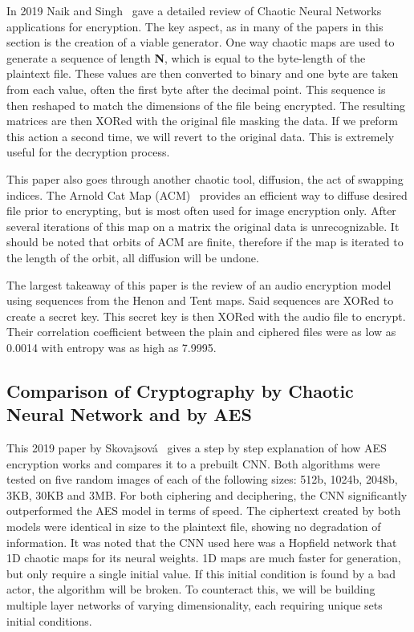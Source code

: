 \documentclass[conference]{IEEEtran}
\begin{document}
In 2019 Naik and Singh~\cite{Naik2022} gave a detailed review of Chaotic Neural Networks applications for encryption.
The key aspect, as in many of the papers in this section is the creation of a viable generator.
One way chaotic maps are used to generate a sequence of length \textbf{N}, which is equal to the byte-length of the plaintext file.
These values are then converted to binary and one byte are taken from each value, often the first byte after the decimal point.
This sequence is then reshaped to match the dimensions of the file being encrypted.
The resulting matrices are then XORed with the original file masking the data.
If we preform this action a second time, we will revert to the original data.
This is extremely useful for the decryption process.

This paper also goes through another chaotic tool, diffusion, the act of swapping indices.
The Arnold Cat Map (ACM)~\cite{Naik2022} provides an efficient way to diffuse desired file prior to encrypting, but is most often used for image encryption only.
After several iterations of this map on a matrix the original data is unrecognizable.
It should be noted that orbits of ACM are finite, therefore if the map is iterated to the length of the orbit, all diffusion will be undone.

The largest takeaway of this paper is the review of an audio encryption model using sequences from the Henon and Tent maps.
Said sequences are XORed to create a secret key.
This secret key is then XORed with the audio file to encrypt.
Their correlation coefficient between the plain and ciphered files were as low as 0.0014 with entropy was as high as 7.9995.

\subsection{\textbf{Comparison of Cryptography by Chaotic Neural Network and by AES}}\label{subsec:comparison-of-cryptography-by-chaotic-neural-network-and-by-aes}

This 2019 paper by Skovajsová~\cite{Skovajsova2019} gives a step by step explanation of how AES encryption works and compares it to a prebuilt CNN.
Both algorithms were tested on five random images of each of the following sizes: 512b, 1024b, 2048b, 3KB, 30KB and 3MB.
For both ciphering and deciphering, the CNN significantly outperformed the AES model in terms of speed.
The ciphertext created by both models were identical in size to the plaintext file, showing no degradation of information.
It was noted that the CNN used here was a Hopfield network that 1D chaotic maps for its neural weights.
1D maps are much faster for generation, but only require a single initial value.
If this initial condition is found by a bad actor, the algorithm will be broken.
To counteract this, we will be building multiple layer networks of varying dimensionality, each requiring unique sets initial conditions.
\end{document}
